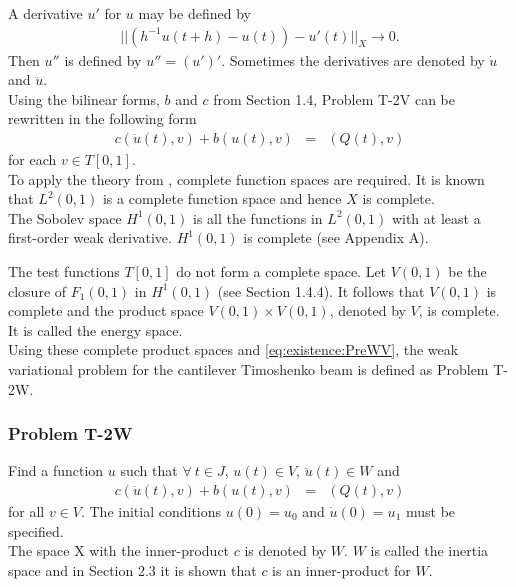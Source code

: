 \documentclass[../../main.tex]{subfiles}
\begin{document}
A derivative $u'$ for $u$ may be defined by
\begin{eqnarray*}
	||\left(h^{-1} u(t+h)-u(t)\right)-u'(t)||_X \rightarrow 0.
\end{eqnarray*} Then $u''$ is defined by $u'' = (u')'$. Sometimes the derivatives are denoted by $\dot{u}$ and $\ddot{u}$.\\

Using the bilinear forms, $b$ and $c$ from Section 1.4, Problem T-2V can be rewritten in the following form
\begin{eqnarray}
	c(\ddot{u}(t),v) + b(u(t),v) & = & (Q(t),v) \label{eq:existence:PreWV}
\end{eqnarray} for each $v \in T[0,1]$.\\

To apply the theory from \cite{VV02}, complete function spaces are required. It is known that $L^2(0,1)$ is a complete function space and hence $X$ is complete.\\

The Sobolev space $H^1(0,1)$ is all the functions in $L^2(0,1)$ with at least a first-order weak derivative. $H^1(0,1)$ is complete (see Appendix A).\label{sym:Hn}

The test functions $T[0,1]$ do not form a complete space. Let $V(0,1)$ be the closure of {$F_1(0,1)$} in $H^1(0,1)$ (see Section 1.4.4). It follows that $V(0,1)$ is complete and the product space {$V(0,1)\times V(0,1)$}, denoted by $V$, is complete. It is called the energy space.\\

Using these complete product spaces and \eqref{eq:existence:PreWV}, the weak variational problem for the cantilever Timoshenko beam is defined as Problem T-2W.

\subsubsection{Problem T-2W}\label{sssec:existence:ProblemT2W}
Find a function $u$ such that $\forall \ t \in J$, $u(t) \in V$, $\ddot{u}(t) \in W$ and
\begin{eqnarray*}
	c(\ddot{u}(t),v) + b(u(t),v) & = & (Q(t),v)
\end{eqnarray*}
for all $v\in V$. The initial conditions $u(0) = u_0$ and $\dot{u}(0)=u_1$ must be specified.\\

The space X with the inner-product $c$ is denoted by $W$. $W$ is called the inertia space and in Section 2.3 it is shown that $c$ is an inner-product for $W$.\\
\end{document}
